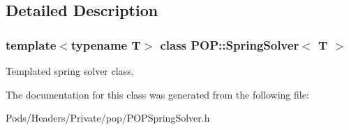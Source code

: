 \subsection{Detailed Description}
\subsubsection*{template$<$typename T$>$\newline
class P\+O\+P\+::\+Spring\+Solver$<$ T $>$}

Templated spring solver class. 

The documentation for this class was generated from the following file\+:\begin{DoxyCompactItemize}
\item 
Pods/\+Headers/\+Private/pop/P\+O\+P\+Spring\+Solver.\+h\end{DoxyCompactItemize}
